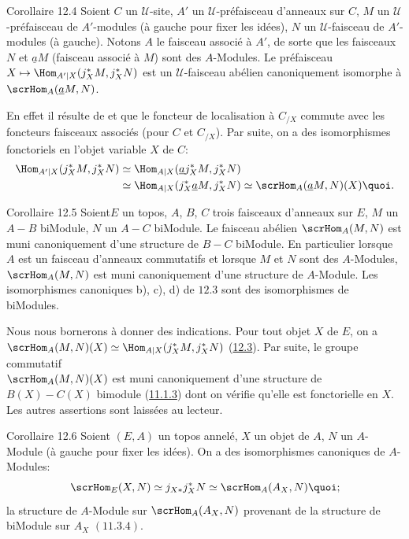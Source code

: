\documentclass[10pt]{../fichiers-configuration-latex/smfart}
\begin{document}
\begin{enonce*}{Corollaire 12.4}
Soient $C$ un $𝒰$-site, $A'$ un $𝒰$-préfaisceau
d'anneaux sur $C$, $M$ un $𝒰$-préfaisceau de $A'$-modules (à
gauche pour fixer les idées), $N$ un $𝒰$-faisceau de
$A'$-modules (à gauche). Notons $A$ le faisceau associé à $A'$, de
sorte que les faisceaux $N$ et $\underline{a}M$ (faisceau associé à $M$)
sont des $A$-Modules. Le préfaisceau $X\mapsto \Hom_{A'|
X}(j^{\ast}_XM, j^{\ast}_XN)$ est un $𝒰$-faisceau abélien
canoniquement isomorphe à $\scrHom_A(\underline{a}M,N)$.
\end{enonce*}

En effet il résulte de  et  que
le foncteur de localisation à $C_{/X}$ commute avec les foncteurs
faisceaux associés (pour $C$ et $C_{/X}$). Par suite, on a des
isomorphismes fonctoriels en l'objet variable $X$ de $C$:
\begin{align*}
\Hom_{A'| X}(j^{\ast}_XM, j^{\ast}_XN) &\simeq \Hom_{A|
X}(\underline{a}j^{\ast}_XM, j^{\ast}_XN)\\
&\simeq \Hom_{A| X}(j^{\ast}_X \underline{a}M, j^{\ast}_XN)\simeq
\scrHom_A (\underline{a}M, N)(X){\quoi}.
\end{align*}

\begin{enonce*}{Corollaire 12.5}
Soient\pageoriginale $E$ un topos, $A$, $B$, $C$ trois faisceaux
d'anneaux sur $E$, $M$ un $A-B$ biModule, $N$ un $A-C$ biModule. Le
faisceau abélien $\scrHom_A(M,N)$ est muni canoniquement d'une
structure de $B-C$ biModule. En particulier lorsque $A$ est un
faisceau d'anneaux commutatifs et lorsque $M$ et $N$ sont des
$A$-Modules, $\scrHom_A(M,N)$ est muni canoniquement d'une structure
de $A$-Module. Les isomorphismes canoniques {\rm b), c), d)} de
$\hyperref[IV.prop12.3]{12.3}$ sont des isomorphismes de biModules.
\end{enonce*}

Nous nous bornerons à donner des indications. Pour tout objet $X$ de
$E$, on a $\scrHom_A(M,N)(X)\simeq \Hom_{A| X}(j^{\ast}_XM,
j^{\ast}_XN)$ (\hyperref[IV.prop12.3]{12.3}). Par suite, le groupe commutatif\\
$\scrHom_A(M,N)(X)$ est muni canoniquement d'une structure de
$B(X)-C(X)$ bimodule (\hyperref[IV.subsubsec11.1.3]{11.1.3}) dont on vérifie
qu'elle est fonctorielle en $X$. Les autres assertions sont laissées
au lecteur.

\begin{enonce*}{Corollaire 12.6}
Soient $(E,A)$ un topos annelé, $X$ un objet de $A$, $N$ un
$A$-Module (à gauche pour fixer les idées). On a des isomorphismes
canoniques de $A$-Modules:
$$
\scrHom_E(X,N)\simeq j_{X\ast}j^{\ast}_XN\simeq \scrHom_A(A_X,
N){\quoi};
$$
la structure de $A$-Module sur $\scrHom_A(A_X,N)$ provenant de la
structure de biModule sur $A_X$ $(\hyperref[IV.rem11.3.4]{11.3.4})$.
\end{enonce*}
\end{document}
